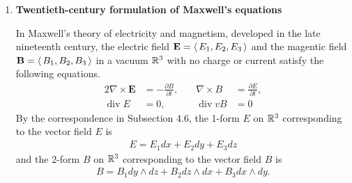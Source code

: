 \documentclass[12pt,a4paper]{report}
\begin{document}
\begin{enumerate}[label=19.\arabic*]
In Subsection 14.1 we showed that $C^\infty$ vector field $X$ on a manifold $M$ gives rise to a derivation of $C^\infty(M)$. We will now show that every derivation of $C^\infty(M)$ arise from one and only one vector field, as promised earlier. To distingisg the vector field from the derivation, we will temporarily denote the derivation arising from $X$ by $\varphi(X)$.  Thus, for any $f\in C^\infty(M)$,
\begin{align*}
	(\varphi(X)f)(p)=x_pf,\, \text{for all }p \in M.
\end{align*}\begin{enumerate}[label=(\alph*)]
	\item Let $\mathcal{F}= C^\infty(M)$.  Prove that $\varphi: \XXX(M) \to \DER(C^\infty(M))$ is an $\mathcal{F}$-linear map.
	
	\item Show that $\varphi$ is injective.
	\item If $D$ is a derivation of $C^\infty(M)$ and $p\in M$, defined $D_p:C_p^\infty(M) \to C_p^\infty(M)$ by
	\begin{align*}
		D_p[f] = [D\hat{f}] \in C_p^\infty(M),
	\end{align*}where $[f]$ is the germ of $f$ at $p$ and $\hat{f}$ is a global extension of $f$, such as those given by Proposition 18.8.  Show that $D_p[f]$ is well defined. (\textit{Hint:} Apply probloem 19.7.)
	
	\item Show that $D_p$ is a derivation of $C_p^\infty(M)$.
	\item Prove that $\varphi:\XXX(M)\to \DER(C^\infty(M))$ is an isomorphism of $\mathcal{F}$-modules.

\end{enumerate}

\item \textbf{Twentieth-century formulation of Maxwell's equations}

In Maxwell's theory of electricity and magnetism, developed in the late nineteenth century,  the electric field $\textbf{E}=\left \langle\, E_1,E_2,E_3 \,\right \rangle$ and the magentic field $\textbf{B}=\left \langle\, B_1,B_2,B_3 \,\right \rangle$ in a vacuum $\mathbb{R}^3$ with no charge or current satisfy the following equations.
\begin{alignat*}{2}
	\nabla\times\textbf{E}&= -\frac{\partial B}{\partial t}, & \quad \nabla\times B&=\frac{\partial E}{\partial t},\\
	\operatorname{div} E&=0, &\quad \operatorname{div}v B&=0
\end{alignat*}By the correspondence in Subsection 4.6, the 1-form $E$ on $\mathbb{R}^3$ corresponding to the vector field $E$ is 
\begin{align*}
	E=E_1dx+E_2dy+E_3dz
\end{align*}and the 2-form $B$ on $\mathbb{R}^3$ corresponding to the vector field $B$ is
\begin{align*}
	B=B_1 dy\wedge dz + B_2 dz\wedge dx + B_3 dx \wedge dy.
\end{align*}


\end{enumerate}
\end{document}
